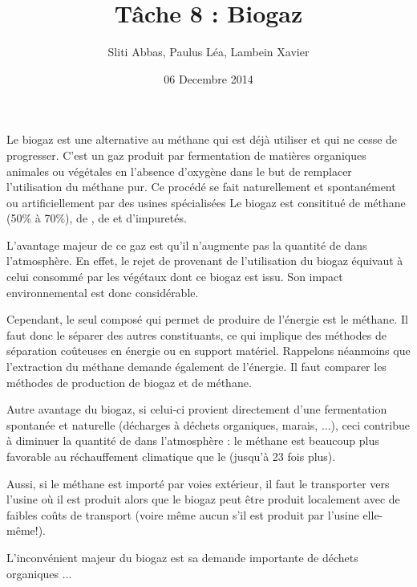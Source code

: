 \documentclass[10pt,a4paper]{article}
\title{Tâche 8 : Biogaz}
\author{Sliti Abbas, Paulus Léa, Lambein Xavier}
\date{06 Decembre 2014}
\begin{document}
\maketitle

Le biogaz est une alternative au méthane qui est déjà utiliser et qui ne cesse de progresser. C'est un gaz produit par fermentation de matières organiques animales ou végétales en l'absence d'oxygène dans le but de remplacer l'utilisation du méthane pur. Ce procédé se fait naturellement et spontanément ou artificiellement par des usines spécialisées  Le biogaz est consititué de méthane (50\% à 70\%), de , de  et d'impuretés. 

L'avantage majeur de ce gaz est qu'il n'augmente pas la quantité de  dans l'atmosphère. En effet, le rejet de  provenant de l'utilisation du biogaz équivaut à celui consommé par les végétaux dont ce biogaz est issu. Son impact environnemental est donc considérable.

Cependant, le seul composé qui permet de produire de l'énergie est le méthane. Il faut donc le séparer des autres constituants, ce qui implique des méthodes de séparation coûteuses en énergie ou en support matériel. Rappelons néanmoins que l'extraction du méthane demande également de l'énergie. Il faut comparer les méthodes de production de biogaz et de méthane.

Autre avantage du biogaz, si celui-ci provient directement d'une fermentation spontanée et naturelle (décharges à déchets organiques, marais, ...), ceci contribue à diminuer la quantité de  dans l'atmosphère : le méthane est beaucoup plus favorable au réchauffement climatique que le  (jusqu'à 23 fois plus).

Aussi, si le méthane est importé par voies extérieur, il faut le transporter vers l'usine où il est produit alors que le biogaz peut être produit localement avec de faibles coûts de transport (voire même aucun s'il est produit par l'usine elle-même!).

L'inconvénient majeur du biogaz est sa demande importante de déchets organiques ...
\end{document}
